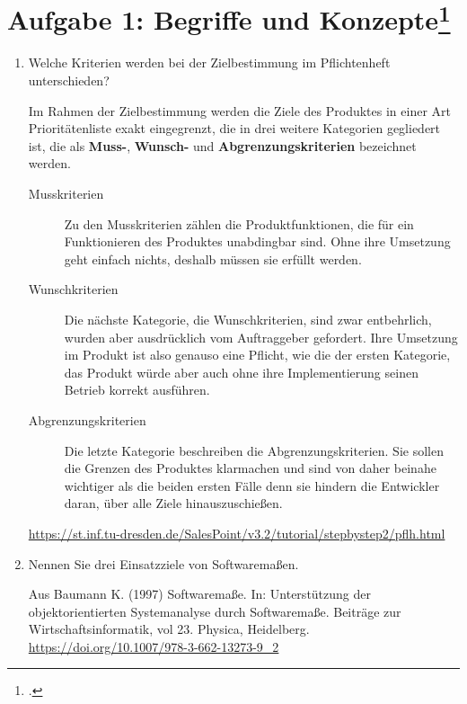 \documentclass{lehramt-informatik-aufgabe}
\begin{document}
\section{Aufgabe 1: Begriffe und Konzepte\footcite{66116:2016:09}}

\begin{enumerate}


\item Welche Kriterien werden bei der Zielbestimmung im
Pflichtenheft unterschieden?

\begin{antwort}
Im Rahmen der Zielbestimmung werden die Ziele des Produktes in einer Art
Prioritätenliste exakt eingegrenzt, die in drei weitere Kategorien
gegliedert ist, die als \textbf{Muss-}, \textbf{Wunsch-} und
\textbf{Abgrenzungskriterien} bezeichnet werden.

\begin{description}
\item[Musskriterien] Zu den Musskriterien zählen die Produktfunktionen,
die für ein Funktionieren des Produktes unabdingbar sind. Ohne ihre
Umsetzung geht einfach nichts, deshalb müssen sie erfüllt werden.

\item[Wunschkriterien] Die nächste Kategorie, die Wunschkriterien, sind
zwar entbehrlich, wurden aber ausdrücklich vom Auftraggeber gefordert.
Ihre Umsetzung im Produkt ist also genauso eine Pflicht, wie die der
ersten Kategorie, das Produkt würde aber auch ohne ihre Implementierung
seinen Betrieb korrekt ausführen.

\item[Abgrenzungskriterien] Die letzte Kategorie  beschreiben die
Abgrenzungskriterien. Sie sollen die Grenzen des Produktes klarmachen
und sind von daher beinahe wichtiger als die beiden ersten Fälle denn
sie hindern die Entwickler daran, über alle Ziele hinauszuschießen.
\end{description}

\url{https://st.inf.tu-dresden.de/SalesPoint/v3.2/tutorial/stepbystep2/pflh.html}
\end{antwort}


\item Nennen Sie drei Einsatzziele von Softwaremaßen.

\begin{antwort}
Aus
Baumann K. (1997) Softwaremaße. In: Unterstützung der objektorientierten
Systemanalyse durch Softwaremaße. Beiträge zur Wirtschaftsinformatik,
vol 23. Physica, Heidelberg. \url{https://doi.org/10.1007/978-3-662-13273-9_2}


\end{antwort}
\end{enumerate}
\end{document}
